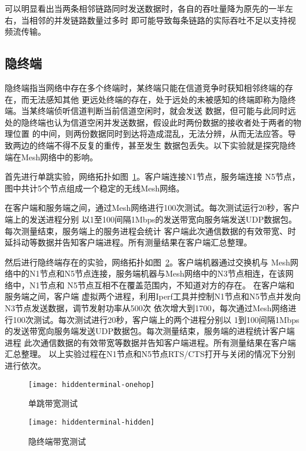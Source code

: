 可以明显看出当两条相邻链路同时发送数据时，各自的吞吐量降为原先的一半左右，当相邻的并发链路数量过多时
即可能导致每条链路的实际吞吐不足以支持视频流传输。

\subsection{隐终端}
隐终端指当网络中存在多个终端时，某终端只能在信道竞争时获知相邻终端的存在，而无法感知其他
更远处终端的存在，处于远处的未被感知的终端即称为隐终端。当某终端侦听信道判断当前信道空闲时，就会发送
数据，但可能与此同时远处的隐终端也认为信道空闲并发送数据，假设此时两份数据的接收者处于两者的物理位置
的中间，则两份数据同时到达将造成混乱，无法分辨，从而无法应答。导致两边的终端不得不反复的重传，甚至发生
数据包丢失。以下实验就是探究隐终端在Mesh网络中的影响。

首先进行单跳实验，网络拓扑如图~\ref{fig:hiddenterminal-1}。客户端连接N1节点，服务端连接
N5节点，图中共计5个节点组成一个稳定的无线Mesh网络。

在客户端和服务端之间，通过Mesh网络进行100次测试。每次测试运行20秒，客户端上的发送进程分别
以1至100间隔1Mbps的发送带宽向服务端发送UDP数据包。每次测量结束，服务端上的服务进程会统计
客户端此次通信数据的有效带宽、时延抖动等数据并告知客户端进程。所有测量结果在客户端汇总整理。

然后进行隐终端存在的实验，网络拓扑如图~\ref{fig:hiddenterminal-2}。客户端机器通过交换机与
Mesh网络中的N1节点和N5节点连接，服务端机器与Mesh网络中的N3节点相连，在该网络中，N1节点和
N5节点互相不在覆盖范围内，不知道对方的存在。
在客户端和服务端之间，客户端
虚拟两个进程，利用Iperf工具并控制N1节点和N5节点并发向N3节点发送数据，调节发射功率从500次
依次增大到1700，每次通过Mesh网络进行100次测试。每次测试进行20秒，客户端上的两个进程分别以
1到100间隔1Mbps的发送带宽向服务端发送UDP数据包。每次测量结束，服务端的进程统计客户端进程
此次通信数据的有效带宽等数据并告知客户端进程。所有测量结果在客户端汇总整理。
以上实验过程在N1节点和N5节点RTS/CTS打开与关闭的情况下分别进行依次。

\begin{figure}[H] %
  \centering
  \texttt{[image: hiddenterminal-onehop]}
  \caption{单跳带宽测试}
  \label{fig:hiddenterminal-1}
\end{figure}
\begin{figure}[H] %
  \centering
  \texttt{[image: hiddenterminal-hidden]}
  \caption{隐终端带宽测试}
  \label{fig:hiddenterminal-2}
\end{figure}

